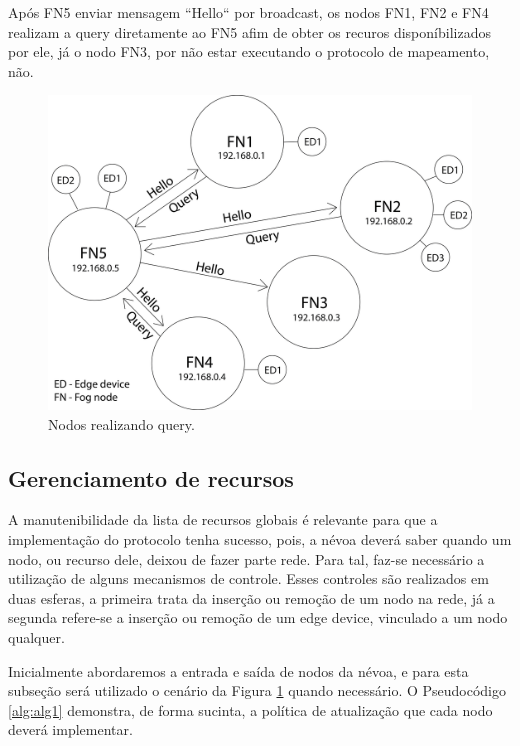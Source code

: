 Após FN5 enviar mensagem  “Hello“ por broadcast, os nodos FN1, FN2 e FN4 realizam a query diretamente ao FN5 afim de obter os recuros disponíbilizados por ele,
já o nodo FN3, por não estar executando o protocolo de mapeamento, não.


\begin{figure}[htb!]
    \centering\includegraphics[width=.5\textwidth]{fig6.png}
    \caption%
    {\label{fig:fig6} Nodos realizando query.}
\end{figure}


\subsection{Gerenciamento de recursos}

A manutenibilidade da lista de recursos globais é relevante para que a implementação do protocolo tenha sucesso, pois, a névoa deverá saber quando um nodo, ou recurso dele, deixou de fazer parte rede.
Para tal, faz-se necessário a utilização de alguns mecanismos de controle.
Esses controles são realizados em duas esferas, a primeira trata da inserção ou remoção de um nodo na rede,
já a segunda refere-se a inserção ou remoção de um edge device, vinculado a um nodo qualquer.



Inicialmente abordaremos a entrada e saída de nodos da névoa, e para esta subseção será utilizado o cenário da Figura \ref{fig:fig6} quando necessário.
O Pseudocódigo \ref{alg:alg1} demonstra, de forma sucinta, a política de atualização que cada nodo deverá implementar.

